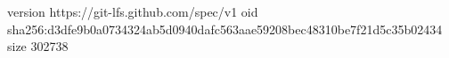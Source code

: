 version https://git-lfs.github.com/spec/v1
oid sha256:d3dfe9b0a0734324ab5d0940dafc563aae59208bec48310be7f21d5c35b02434
size 302738
